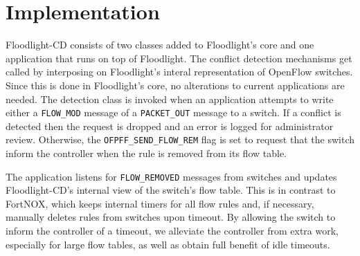 \section{Implementation}
\label{sec:implementation}

Floodlight-CD consists of two classes added to Floodlight's core and one application that runs on top of Floodlight.
The conflict detection mechanisms get called by interposing on Floodlight's interal representation of OpenFlow switches.
Since this is done in Floodlight's core, no alterations to current applications are needed.
The detection class is invoked when an application attempts to write either a \texttt{FLOW\_MOD} message of a \texttt{PACKET\_OUT} message to a switch.
If a conflict is detected then the request is dropped and an error is logged for administrator review.
Otherwise, the \texttt{OFPFF\_SEND\_FLOW\_REM} flag is set to request that the switch inform the controller when the rule is removed from its flow table.

The application listens for \texttt{FLOW\_REMOVED} messages from switches and updates Floodlight-CD's internal view of the switch's flow table.
This is in contrast to FortNOX, which keeps internal timers for all flow rules and, if necessary, manually deletes rules from switches upon timeout.
By allowing the switch to inform the controller of a timeout, we alleviate the controller from extra work, especially for large flow tables, as well as obtain full benefit of idle timeouts.

